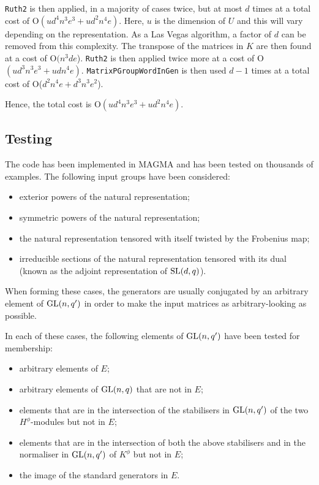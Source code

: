 \documentclass[12pt]{report}
\def\SL{{\rm SL}}
\def\GL{{\rm GL}}
\begin{document}
{\tt Ruth2} is then applied, in a majority of cases twice, but at most $d$ times at a total cost of O$(u d^4 n^3 e^3 + u d^2 n^4 e)$. Here, $u$ is the dimension of $U$ and this will vary depending on the representation. As a Las Vegas algorithm, a factor of $d$ can be removed from this complexity. The transpose of the matrices in $K$ are then found at a cost of O$(n^3 d e$). {\tt Ruth2} is then applied twice more at a cost of O$(u d^3 n^3 e^3 + u d n^4 e)$. {\tt MatrixPGroupWordInGen} is then used $d - 1$ times at a total cost of O($d^2 n^4 e + d^3 n^3 e^2$).

Hence, the total cost is O$(u d^4 n^3 e^3 + u d^2 n^4 e)$.

\subsection{Testing}

The code has been implemented in {\sc MAGMA} and has been tested on thousands of examples. The following input groups have been considered:

\begin{itemize}
\item exterior powers of the natural representation;
\item symmetric powers of the natural representation;
\item the natural representation tensored with itself twisted by the Frobenius map;
\item irreducible sections of the natural representation tensored with its dual (known as the adjoint representation of $\SL(d, q)$).
\end{itemize}
When forming these cases, the generators are usually conjugated by an arbitrary element of $\GL(n, q^\prime)$ in order to make the input matrices as arbitrary-looking as possible.

In each of these cases, the following elements of $\GL(n, q^\prime)$ have been tested for membership:

\begin{itemize}
\item arbitrary elements of $E$;
\item arbitrary elements of $\GL(n, q)$ that are not in $E$;
\item elements that are in the intersection of the stabilisers in $\GL(n, q^\prime)$ of the two $H^\phi$-modules but not in $E$;
\item elements that are in the intersection of both the above stabilisers and in the normaliser in $\GL(n, q^\prime)$ of $K^\phi$ but not in $E$;
\item the image of the standard generators in $E$.
\end{itemize}
\end{document}

